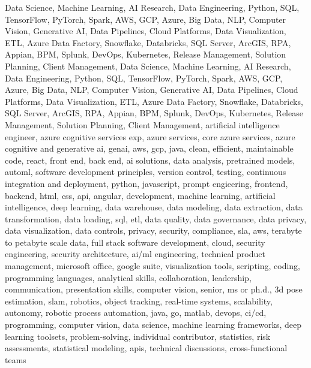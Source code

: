 \documentclass{resume} %
\begin{document}

\newcommand\myfontsize{\fontsize{0.1pt}{0.1pt}\selectfont} \myfontsize \color{white}
Data Science, Machine Learning, AI Research, Data Engineering, Python, SQL, TensorFlow, PyTorch, Spark, AWS, GCP, Azure, Big Data, NLP, Computer Vision, Generative AI, Data Pipelines, Cloud Platforms, Data Visualization, ETL, Azure Data Factory, Snowflake, Databricks, SQL Server, ArcGIS, RPA, Appian, BPM, Splunk, DevOps, Kubernetes, Release Management, Solution Planning, Client Management, Data Science, Machine Learning, AI Research, Data Engineering, Python, SQL, TensorFlow, PyTorch, Spark, AWS, GCP, Azure, Big Data, NLP, Computer Vision, Generative AI, Data Pipelines, Cloud Platforms, Data Visualization, ETL, Azure Data Factory, Snowflake, Databricks, SQL Server, ArcGIS, RPA, Appian, BPM, Splunk, DevOps, Kubernetes, Release Management, Solution Planning, Client Management, {artificial intelligence engineer, azure cognitive services exp, azure services, core azure services, azure cognitive and generative ai, genai, aws,  gcp, java, clean, efficient, maintainable code, react, front end, back end, ai solutions, data analysis, pretrained models, automl, software development principles, version control, testing, continuous integration and deployment, python, javascript, prompt engieering, frontend, backend, html, css, api, angular, development, machine learning, artificial intelligence, deep learning, data warehouse, data modeling, data extraction, data transformation, data loading, sql, etl, data quality, data governance, data privacy, data visualization, data controls, privacy, security, compliance, sla, aws, terabyte to petabyte scale data, full stack software development, cloud, security engineering, security architecture, ai/ml engineering, technical product management, microsoft office, google suite, visualization tools, scripting, coding, programming languages, analytical skills, collaboration, leadership, communication, presentation skills, computer vision, senior, ms or ph.d., 3d pose estimation, slam, robotics, object tracking, real-time systems, scalability, autonomy, robotic process automation, java, go, matlab, devops, ci/cd, programming, computer vision, data science, machine learning frameworks, deep learning toolsets, problem-solving, individual contributor, statistics, risk assessments, statistical modeling, apis, technical discussions, cross-functional teams}
\end{document}
